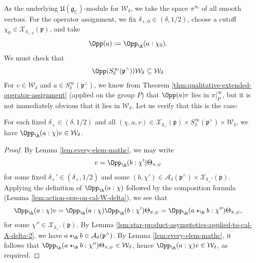 As the underlying $\mathfrak{U}(\mathfrak{g}_\mathbb{C})$-module for $\mathcal{W}_\delta$, we take the space $\pi^\infty$ of all smooth vectors.  For the operator assignment, we fix $\delta_{+,0} \in (\delta,1/2)$, choose a cutoff $\chi_0 \in \mathcal{X}_{\delta_{+,0}}(\mathfrak{p})$, and take
\begin{equation*}
  \Opp(a) := \Opp_{\h}(a:\chi_0).
\end{equation*}
We must check that
\begin{equation*}
  \Opp( S^\infty_\delta(\mathfrak{p}^\wedge)) \mathcal{W}_\delta \subseteq \mathcal{W}_\delta
\end{equation*}
For $v \in \mathcal{W}_\delta$ and $a \in S^\infty_\delta(\mathfrak{p}^\wedge)$, we know from Theorem \ref{thm:qualitative-extended-operator-assignment} (applied on the group $P$) that $\Opp(a) v$ lies in $\pi|_P^\infty$, but it is not immediately obvious that it lies in $\mathcal{W}_\delta$.  Let us verify that this is the case:
\begin{lemma}\label{lem:each-a-v}
  For each fixed $\delta_+ \in (\delta, 1/2)$ and all $(\chi,a,v) \in \mathcal{X}_{\delta_+}(\mathfrak{p}) \times S_\delta^\infty(\mathfrak{p}^\wedge) \times \mathcal{W}_\delta$, we have $\Opp_{\h}(a:\chi) v \in \mathcal{W}_\delta$.
\end{lemma}
\begin{proof}
  By Lemma \ref{lem:every-elem-mathc}, we may write
  \begin{equation}\label{eq:v-=-opp_hb:chi}
    v = \Opp_{\h}(b:\chi') \Theta_{\pi,\psi}
  \end{equation}
  for some fixed $\delta_+' \in (\delta_{+},1/2)$ and some $(b,\chi') \in \mathcal{A}_\delta(\mathfrak{p}^\wedge) \times \mathcal{X}_{\delta_+'}(\mathfrak{p})$.  Applying the definition of $\Opp_{\h}(a:\chi)$ followed by the composition formula (Lemma \ref{lem:action-opp-on-cal-W-delta}), we see that
  \begin{equation}\label{eq:oppa-v-Theta-stuff}
    \Opp_{\h}(a:\chi) v
    = \Opp_{\h}(a:\chi) \Opp_{\h}(b:\chi') \Theta_{\pi,\psi}
    = \Opp_{\h}(a \star_{\h} b:\chi'') \Theta_{\pi,\psi},
  \end{equation}
  for some $\chi'' \in \mathcal{X}_{\delta_+'}(\mathfrak{p})$.  By Lemma \ref{lem:star-product-asymptotics-applied-to-cal-A-delta-2}, we have $a \star_{\h} b \in \mathcal{A}_\delta(\mathfrak{p}^\wedge)$.
  By Lemma \ref{lem:every-elem-mathc}, it follows that $\Opp_{\h}(a \star_{\h} b:\chi'') \Theta_{\pi,\psi} \in \mathcal{W}_\delta$, hence $\Opp_{\h}(a:\chi) v \in \mathcal{W}_\delta$, as required.
\end{proof}

